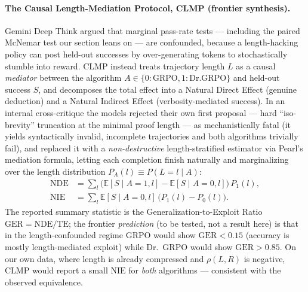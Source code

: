 \paragraph{The Causal Length-Mediation Protocol, CLMP (frontier synthesis).}
Gemini Deep Think argued that marginal pass-rate tests --- including the paired
McNemar test our section leans on --- are confounded, because a length-hacking
policy can post held-out successes by over-generating tokens to stochastically
stumble into reward. CLMP instead treats trajectory length $L$ as a causal
\emph{mediator} between the algorithm $A\in\{0{:}\mathrm{GRPO},1{:}\mathrm{Dr.GRPO}\}$
and held-out success $S$, and decomposes the total effect into a Natural Direct
Effect (genuine deduction) and a Natural Indirect Effect (verbosity-mediated
success). In an internal cross-critique the models rejected their own first
proposal --- hard ``iso-brevity'' truncation at the minimal proof length --- as
mechanistically fatal (it yields syntactically invalid, incomplete trajectories
and both algorithms trivially fail), and replaced it with a \emph{non-destructive}
length-stratified estimator via Pearl's mediation formula, letting each
completion finish naturally and marginalizing over the length distribution
$P_A(l)\equiv P(L{=}l\mid A)$:
\begin{align}
\mathrm{NDE} &= \sum_{l}\bigl(\mathbb{E}[S\mid A{=}1,l]-\mathbb{E}[S\mid A{=}0,l]\bigr)\,P_1(l),\\
\mathrm{NIE} &= \sum_{l}\mathbb{E}[S\mid A{=}0,l]\,\bigl(P_1(l)-P_0(l)\bigr).
\end{align}
The reported summary statistic is the Generalization-to-Exploit Ratio
$\mathrm{GER}=\mathrm{NDE}/\mathrm{TE}$; the frontier \emph{prediction} (to be
tested, not a result here) is that in the length-confounded regime GRPO would
show $\mathrm{GER}<0.15$ (accuracy is mostly length-mediated exploit) while
Dr.~GRPO would show $\mathrm{GER}>0.85$. On our own data, where length is already
compressed and $\rho(L,R)$ is negative, CLMP would report a small $\mathrm{NIE}$
for \emph{both} algorithms --- consistent with the observed equivalence.

